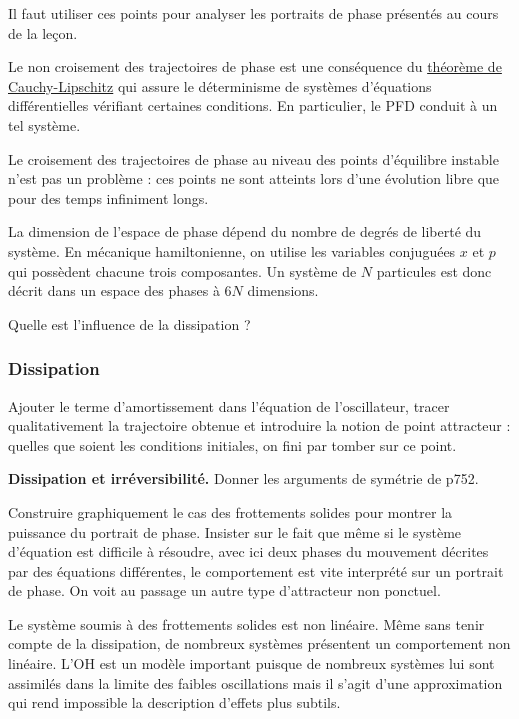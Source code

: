 \begin{remarque}
Il faut utiliser ces points pour analyser les portraits de phase présentés au cours de la leçon.

\noindent
Le non croisement des trajectoires de phase est une conséquence du \href{https://fr.wikipedia.org/wiki/Th\%C3\%A9or\%C3\%A8me_de_Cauchy-Lipschitz}{théorème de Cauchy-Lipschitz} qui assure le déterminisme de systèmes d'équations différentielles vérifiant certaines conditions.
En particulier, le PFD conduit à un tel système.

\noindent
Le croisement des trajectoires de phase au niveau des points d'équilibre instable n'est pas un problème : ces points ne sont atteints lors d'une évolution libre que pour des temps infiniment longs.

\noindent
La dimension de l'espace de phase dépend du nombre de degrés de liberté du système.
En mécanique hamiltonienne, on utilise les variables conjuguées $x$ et $p$ qui possèdent chacune trois composantes.
Un système de $N$ particules est donc décrit dans un espace des phases à $6N$ dimensions.
\end{remarque}

\begin{transition}
Quelle est l'influence de la dissipation ?
\end{transition}

\subsubsection{Dissipation}

Ajouter le terme d'amortissement dans l'équation de l'oscillateur, tracer qualitativement la trajectoire obtenue et introduire la notion de point attracteur : quelles que soient les conditions initiales, on fini par tomber sur ce point.

\begin{slide}
\textbf{Dissipation et irréversibilité.}
Donner les arguments de symétrie de \cite{Gie1992} p752.
\end{slide}

Construire graphiquement le cas des frottements solides pour montrer la puissance du portrait de phase.
Insister sur le fait que même si le système d'équation est difficile à résoudre, avec ici deux phases du mouvement décrites par des équations différentes, le comportement est vite interprété sur un portrait de phase.
On voit au passage un autre type d'attracteur non ponctuel.

\begin{transition}
Le système soumis à des frottements solides est non linéaire.
Même sans tenir compte de la dissipation, de nombreux systèmes présentent un comportement non linéaire.
L'OH est un modèle important puisque de nombreux systèmes lui sont assimilés dans la limite des faibles oscillations mais il s'agit d'une approximation qui rend impossible la description d'effets plus subtils.
\end{transition}

